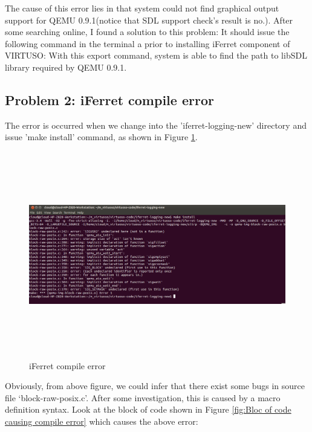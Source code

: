 The cause of this error lies in that system could not find graphical output support for QEMU 0.9.1(notice that SDL support check's 
result is no.). After some searching online, I found a solution to this problem: It should issue the following command in the terminal a prior to
installing iFerret component of VIRTUSO:
With this export command, system is able to find the path to libSDL library required by QEMU 0.9.1.


\subsection{Problem 2: iFerret compile error}
The error is occurred when we change into the 'iferret-logging-new' directory and issue 'make install' command, as shown in Figure 
\ref{fig:iFerret compile error}.

\begin{figure}[htbp]
	\centering
		\includegraphics[width=14cm, height= 9cm ]{Figures/Figure33.png}
	\caption[iFerret compile error]{iFerret compile error}
	\label{fig:iFerret compile error}
\end{figure}

Obviously, from above figure, we could infer that there exist some bugs in source file ‘block-raw-posix.c’. After some investigation, 
this is caused by a macro definition syntax. Look at the block of code shown in Figure \ref{fig:Bloc of code causing compile error} which
causes the above error:

